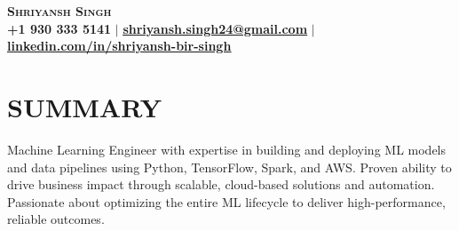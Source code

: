 \documentclass[letterpaper,11pt]{article}
\begin{document}

\begin{center}
    \textbf{\Huge \scshape Shriyansh Singh} \\ \vspace{1pt}
    \small \textbf{+1 930 333 5141}  $|$ \href{mailto:shriyansh.singh24@gmail.com}{\textbf{\underline{shriyansh.singh24@gmail.com}}} $|$ 
    \href{https://www.linkedin.com/in/shriyansh-bir-singh}{\textbf{\underline{linkedin.com/in/shriyansh-bir-singh}}}
\end{center}

\vspace{-25pt}
\section{\textbf{SUMMARY}}
      {Machine Learning Engineer with expertise in building and deploying ML models and data pipelines using Python, TensorFlow, Spark, and AWS. Proven ability to drive business impact through scalable, cloud-based solutions and automation. Passionate about optimizing the entire ML lifecycle to deliver high-performance, reliable outcomes.}
\vspace{-10pt}

\end{document}
